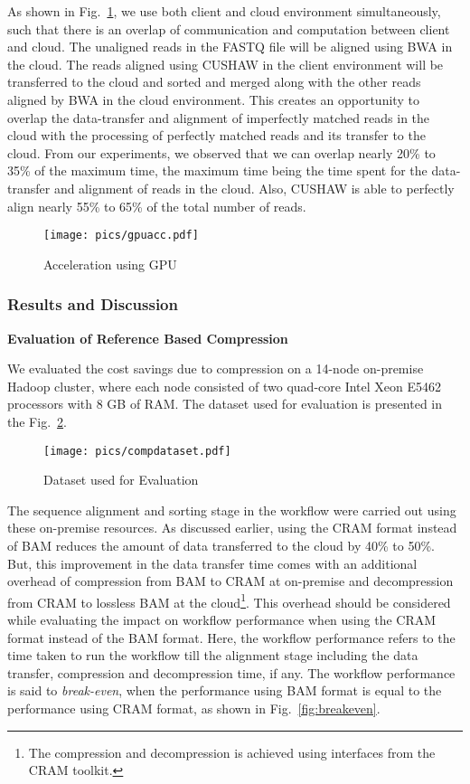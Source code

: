 
As shown in Fig.~\ref{fig:gpuacc}, we use both client and cloud environment simultaneously, such that there is an overlap of communication and computation between client and cloud.  The unaligned reads in the FASTQ file will be aligned using BWA in the cloud.  The reads aligned using CUSHAW in the client environment will be transferred to the cloud and sorted and merged along with the other reads aligned by BWA in the cloud environment. This creates an opportunity to overlap the data-transfer and alignment of imperfectly matched reads in the cloud with the processing of perfectly matched reads and its transfer to the cloud. From our experiments, we observed that we can overlap nearly 20\% to 35\% of the maximum time, the maximum time being the time spent for the data-transfer and alignment of reads in the cloud. Also, CUSHAW is able to perfectly align nearly 55\% to 65\% of the total number of reads.

\begin{figure}[!htbp]
  \centering
  \texttt{[image: pics/gpuacc.pdf]}
  \caption{Acceleration using GPU}
  \label{fig:gpuacc}
\end{figure}

\subsubsection{Results and Discussion}

\noindent\textbf{Evaluation of Reference Based Compression}

We evaluated the cost savings due to compression on a 14-node on-premise Hadoop cluster, where each node consisted of two quad-core Intel Xeon E5462 processors with 8 GB of RAM. The dataset used for evaluation is presented in the Fig.~\ref{fig:compdataset}. 

\begin{figure}[!htbp]
  \centering
  \texttt{[image: pics/compdataset.pdf]}
  \caption{Dataset used for Evaluation}
  \label{fig:compdataset}
\end{figure}

The sequence alignment and sorting stage in the workflow were carried out using these on-premise resources. As discussed earlier, using the CRAM format instead of BAM reduces the amount of data transferred to the cloud by 40\% to 50\%. But, this improvement in the data transfer time comes with an additional overhead of compression from BAM to CRAM at on-premise and decompression from CRAM to lossless BAM at the cloud\footnote{The compression and decompression is achieved using interfaces from the CRAM toolkit.}. This overhead should be considered while evaluating the impact on workflow performance when using the CRAM format instead of the BAM format. Here, the workflow performance refers to the time taken to run the workflow till the alignment stage including the data transfer, compression and decompression time, if any. The workflow performance is said to \textit{break-even}, when the performance using BAM format is equal to the performance using CRAM format, as shown in Fig.~\ref{fig:breakeven}.

